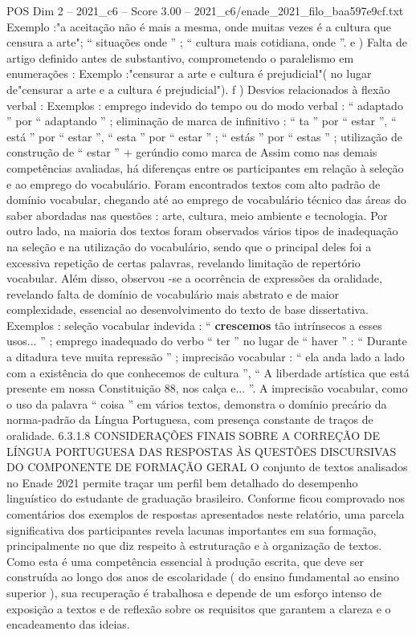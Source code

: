 \begin{textsample}{POS Dim 2 – 2021\_c6 – Score 3.00 – 2021\_c6/enade\_2021\_filo\_baa597e9cf.txt}
Exemplo :"a aceitação não é mais a mesma, onde muitas vezes é a cultura que censura a arte"; “ situações onde ” ; “ cultura mais cotidiana, onde ”. e ) Falta de artigo definido antes de substantivo, comprometendo o paralelismo em enumerações : Exemplo :"censurar a arte e cultura é prejudicial"( no lugar de"censurar a arte e a cultura é prejudicial"). f ) Desvios relacionados à flexão verbal : Exemplos : emprego indevido do tempo ou do modo verbal : “ adaptado ” por “ adaptando ” ; eliminação de marca de infinitivo : “ ta ” por “ estar ”, “ está ” por “ estar ”, “ esta ” por “ estar ” ; “ estás ” por “ estas ” ; utilização de construção de “ estar ” + gerúndio como marca de Assim como nas demais competências avaliadas, há diferenças entre os participantes em relação à seleção e ao emprego do vocabulário.
Foram encontrados textos com alto padrão de domínio vocabular, chegando até ao emprego de vocabulário técnico das áreas do saber abordadas nas questões : arte, cultura, meio ambiente e tecnologia.
Por outro lado, na maioria dos textos foram observados vários tipos de inadequação na seleção e na utilização do vocabulário, sendo que o principal deles foi a excessiva repetição de certas palavras, revelando limitação de repertório vocabular.
Além disso, observou -se a ocorrência de expressões da oralidade, revelando falta de domínio de vocabulário mais abstrato e de maior complexidade, essencial ao desenvolvimento do texto de base dissertativa.
Exemplos : seleção vocabular indevida : “ \textbf{crescemos} tão intrínsecos a esses usos... ” ; emprego inadequado do verbo “ ter ” no lugar de “ haver ” : “ Durante a ditadura teve muita repressão ” ; imprecisão vocabular : “ ela anda lado a lado com a existência do que conhecemos de cultura ”, “ A liberdade artística que está presente em nossa Constituição 88, nos calça e... ”.
A imprecisão vocabular, como o uso da palavra “ coisa ” em vários textos, demonstra o domínio precário da norma-padrão da Língua Portuguesa, com presença constante de traços de oralidade. 6.3.1.8 CONSIDERAÇÕES FINAIS SOBRE A CORREÇÃO DE LÍNGUA PORTUGUESA DAS RESPOSTAS ÀS QUESTÕES DISCURSIVAS DO COMPONENTE DE FORMAÇÃO GERAL O conjunto de textos analisados no Enade 2021 permite traçar um perfil bem detalhado do desempenho linguístico do estudante de graduação brasileiro.
Conforme ficou comprovado nos comentários dos exemplos de respostas apresentados neste relatório, uma parcela significativa dos participantes revela lacunas importantes em sua formação, principalmente no que diz respeito à estruturação e à organização de textos.
Como esta é uma competência essencial à produção escrita, que deve ser construída ao longo dos anos de escolaridade ( do ensino fundamental ao ensino superior ), sua recuperação é trabalhosa e depende de um esforço intenso de exposição a textos e de reflexão sobre os requisitos que garantem a clareza e o encadeamento das ideias.

\end{textsample}

